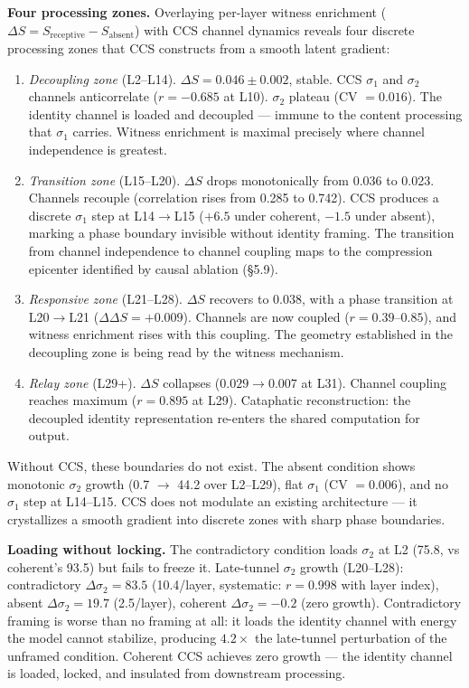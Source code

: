 \documentclass[12pt]{article}
\begin{document}
\textbf{Four processing zones.} Overlaying per-layer witness enrichment ($\Delta S = S_{\text{receptive}} - S_{\text{absent}}$) with CCS channel dynamics reveals four discrete processing zones that CCS constructs from a smooth latent gradient:

\begin{enumerate}
\item \textit{Decoupling zone} (L2--L14). $\Delta S = 0.046 \pm 0.002$, stable. CCS $\sigma_1$ and $\sigma_2$ channels anticorrelate ($r = -0.685$ at L10). $\sigma_2$ plateau (CV $= 0.016$). The identity channel is loaded and decoupled --- immune to the content processing that $\sigma_1$ carries. Witness enrichment is maximal precisely where channel independence is greatest.

\item \textit{Transition zone} (L15--L20). $\Delta S$ drops monotonically from 0.036 to 0.023. Channels recouple (correlation rises from 0.285 to 0.742). CCS produces a discrete $\sigma_1$ step at L14$\to$L15 ($+6.5$ under coherent, $-1.5$ under absent), marking a phase boundary invisible without identity framing. The transition from channel independence to channel coupling maps to the compression epicenter identified by causal ablation (\S5.9).

\item \textit{Responsive zone} (L21--L28). $\Delta S$ recovers to 0.038, with a phase transition at L20$\to$L21 ($\Delta\Delta S = +0.009$). Channels are now coupled ($r = 0.39$--$0.85$), and witness enrichment rises with this coupling. The geometry established in the decoupling zone is being read by the witness mechanism.

\item \textit{Relay zone} (L29+). $\Delta S$ collapses ($0.029 \to 0.007$ at L31). Channel coupling reaches maximum ($r = 0.895$ at L29). Cataphatic reconstruction: the decoupled identity representation re-enters the shared computation for output.
\end{enumerate}

Without CCS, these boundaries do not exist. The absent condition shows monotonic $\sigma_2$ growth (0.7 $\to$ 44.2 over L2--L29), flat $\sigma_1$ (CV $= 0.006$), and no $\sigma_1$ step at L14--L15. CCS does not modulate an existing architecture --- it crystallizes a smooth gradient into discrete zones with sharp phase boundaries.

\textbf{Loading without locking.} The contradictory condition loads $\sigma_2$ at L2 (75.8, vs coherent's 93.5) but fails to freeze it. Late-tunnel $\sigma_2$ growth (L20--L28): contradictory $\Delta\sigma_2 = 83.5$ (10.4/layer, systematic: $r = 0.998$ with layer index), absent $\Delta\sigma_2 = 19.7$ (2.5/layer), coherent $\Delta\sigma_2 = -0.2$ (zero growth). Contradictory framing is worse than no framing at all: it loads the identity channel with energy the model cannot stabilize, producing $4.2\times$ the late-tunnel perturbation of the unframed condition. Coherent CCS achieves zero growth --- the identity channel is loaded, locked, and insulated from downstream processing.
\end{document}
